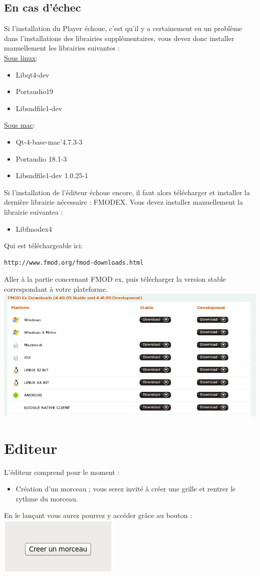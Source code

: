 \documentclass[a4paper]{article}
\begin{document}
\subsection{En cas d'échec} 
Si l'installation du Player échoue, c'est qu'il y a certainement eu un problème dans l'installations des librairies supplémentaires, vous devez donc installer manuellement les librairies suivantes : \\
\underline{Sous linux}:
\begin{itemize}
\item Libqt4-dev
\item Portaudio19
\item Libsndfile1-dev
\end{itemize}
\underline{Sous mac}:
\begin{itemize}
\item Qt-4-base-mac'4.7.3-3
\item Portaudio 18.1-3
\item Libsndfile1-dev 1.0.25-1 
\end{itemize}
Si l'installation de l'éditeur échoue encore, il faut alors télécharger et installer la dernière librairie nécessaire : FMODEX. Vous devez installer manuellement la librairie suivantea : 
\begin{itemize}
\item Libfmodex4
\end{itemize}
Qui est téléchargeable ici: \begin{verbatim}
http://www.fmod.org/fmod-downloads.html
\end{verbatim} 
Aller à la partie concernant FMOD ex, puis télécharger la version stable correspondant à votre plateforme.
\newpage
\includegraphics[scale=0.5]{manulutil1.png}
\newpage 
\section{Editeur}
L'éditeur comprend pour le moment :
\begin{itemize} 
\item Création d'un morceau ; vous serez invité à créer une grille et rentrer le rythme du morceau.
\end{itemize}
En le lançant vous aurez pourrez y accéder grâce au bouton :\\ 
\includegraphics[scale=0.5]{manulutil2.png}
\end{document}
